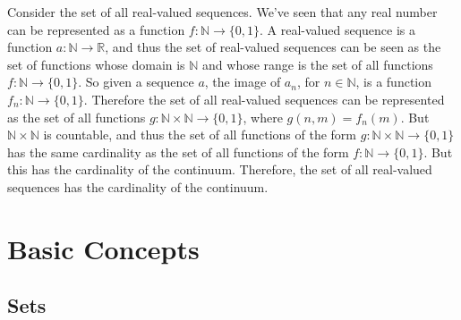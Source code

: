             \begin{lexample}
                Consider the set of all real-valued sequences. We've seen
                that any real number can be represented as a function
                $f:\mathbb{N}\rightarrow\{0,1\}$. A real-valued sequence
                is a function $a:\mathbb{N}\rightarrow\mathbb{R}$, and
                thus the set of real-valued sequences can be seen as the
                set of functions whose domain is $\mathbb{N}$ and whose
                range is the set of all functions
                $f:\mathbb{N}\rightarrow\{0,1\}$. So given a sequence
                $a$, the image of $a_{n}$, for $n\in\mathbb{N}$, is a
                function $f_{n}:\mathbb{N}\rightarrow\{0,1\}$. Therefore
                the set of all real-valued sequences can be represented
                as the set of all functions
                $g:\mathbb{N}\times\mathbb{N}\rightarrow\{0,1\}$, where
                $g(n,m)=f_{n}(m)$. But $\mathbb{N}\times\mathbb{N}$ is
                countable, and thus the set of all functions of the form
                $g:\mathbb{N}\times\mathbb{N}\rightarrow\{0,1\}$ has the
                same cardinality as the set of all functions of the form
                $f:\mathbb{N}\rightarrow\{0,1\}$. But this has the
                cardinality of the continuum. Therefore, the set of all
                real-valued sequences has the cardinality of the continuum.
            \end{lexample}
    \section{Basic Concepts}
        \subsection{Sets}
